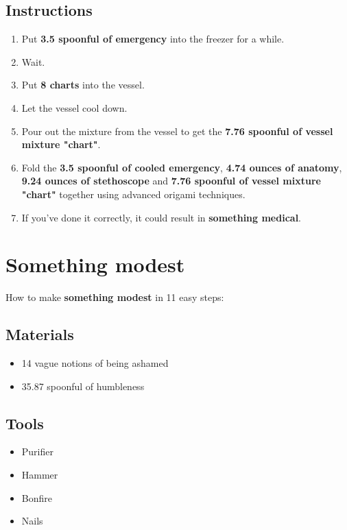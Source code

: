 \documentclass{article}
\begin{document}
\subsection{Instructions}\begin{enumerate}
\item 
Put \textbf{3.5 spoonful of emergency} into the freezer for a while.
\item 
Wait.
\item 
Put \textbf{8 charts} into the vessel.
\item 
Let the vessel cool down.
\item 
Pour out the mixture from the vessel to get the \textbf{7.76 spoonful of vessel mixture "chart"}.
\item 
Fold the \textbf{3.5 spoonful of cooled emergency}, \textbf{4.74 ounces of anatomy}, \textbf{9.24 ounces of stethoscope} and \textbf{7.76 spoonful of vessel mixture "chart"} together using advanced origami techniques.
\item 
If you've done it correctly, it could result in \textbf{something medical}.
\end{enumerate}
\newpage
\section{Something modest}How to make \textbf{something modest} in 11 easy steps:

\subsection{Materials}\begin{itemize}
\item 
14 vague notions of being ashamed
\item 
35.87 spoonful of humbleness
\end{itemize}
\subsection{Tools}\begin{itemize}
\item 
Purifier
\item 
Hammer
\item 
Bonfire
\item 
Nails
\end{itemize}
\end{document}
